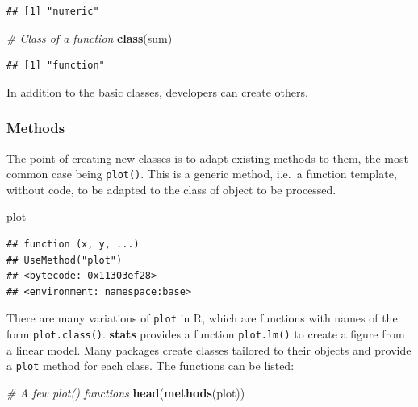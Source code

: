 \documentclass[
  12pt,
  american,
  a4paper,
  extrafontsizes,onecolumn,openright
  ]{memoir}
\newenvironment{Shaded}{\begin{snugshade}}{\end{snugshade}}
\newcommand{\CommentTok}[1]{\textcolor[rgb]{0.56,0.35,0.01}{\textit{#1}}}
\newcommand{\FunctionTok}[1]{\textcolor[rgb]{0.13,0.29,0.53}{\textbf{#1}}}
\newcommand{\NormalTok}[1]{#1}
\begin{document}
\begin{verbatim}
## [1] "numeric"
\end{verbatim}

\begin{Shaded}
\begin{Highlighting}[]
\CommentTok{\# Class of a function}
\FunctionTok{class}\NormalTok{(sum)}
\end{Highlighting}
\end{Shaded}

\begin{verbatim}
## [1] "function"
\end{verbatim}

\normalsize

In addition to the basic classes, developers can create others.

\subsubsection{Methods}\label{methods}

The point of creating new classes is to adapt existing methods to them, the most common case being \texttt{plot()}.
This is a generic method, i.e.~a function template, without code, to be adapted to the class of object to be processed.

\scriptsize

\begin{Shaded}
\begin{Highlighting}[]
\NormalTok{plot}
\end{Highlighting}
\end{Shaded}

\begin{verbatim}
## function (x, y, ...) 
## UseMethod("plot")
## <bytecode: 0x11303ef28>
## <environment: namespace:base>
\end{verbatim}

\normalsize

There are many variations of \texttt{plot} in R, which are functions with names of the form \texttt{plot.class()}.
\textbf{stats} provides a function \texttt{plot.lm()} to create a figure from a linear model.
Many packages create classes tailored to their objects and provide a \texttt{plot} method for each class.
The functions can be listed:

\scriptsize

\begin{Shaded}
\begin{Highlighting}[]
\CommentTok{\# A few plot() functions}
\FunctionTok{head}\NormalTok{(}\FunctionTok{methods}\NormalTok{(plot))}
\end{Highlighting}
\end{Shaded}
\end{document}
